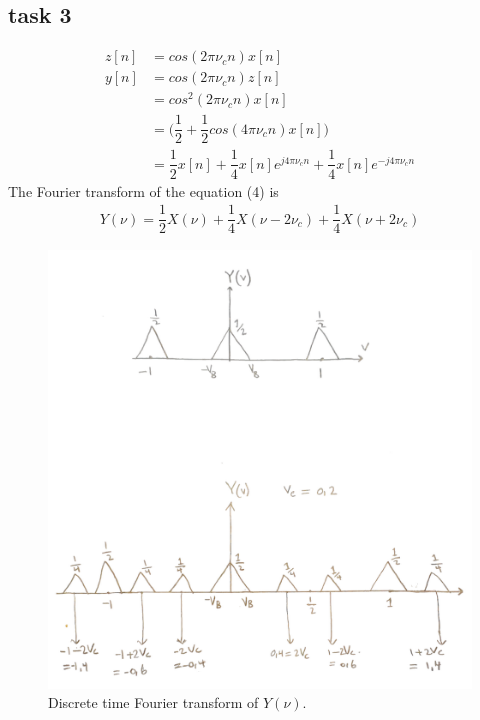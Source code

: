 \documentclass[a4paper,twocolumn]{article}
\begin{document}
\subsection{task 3}
\begin{equation}
\begin{aligned}
z[n] &= cos(2\pi \nu_cn)x[n] \\
y[n] &= cos(2\pi \nu_cn)z[n] \\
&= cos^2(2\pi \nu_cn)x[n] \\
&= \big(\dfrac{1}{2} + \dfrac{1}{2}cos(4\pi \nu_cn)x[n]\big) \\
&= \dfrac{1}{2}x[n] +\dfrac{1}{4} x[n]e^{j4\pi \nu_cn} + \dfrac{1}{4}x[n]e^{-j4\pi \nu_cn}
 \end{aligned}    
\end{equation}
The Fourier transform of the equation (4) is 
\begin{equation}
\begin{aligned}
Y(\nu) = \dfrac{1}{2}X(\nu) + \dfrac{1}{4}X(\nu - 2\nu_c) + \dfrac{1}{4}X(\nu + 2\nu_c)
 \end{aligned}    
\end{equation}

\begin{figure}[H]
  \begin{center}
    \includegraphics[width=0.83\columnwidth]{task3corped.pdf}
  \end{center}
  \caption{Discrete time Fourier transform of $Y(\nu)$.}
  \label{fig:prestanda}
\end{figure}
\end{document}
